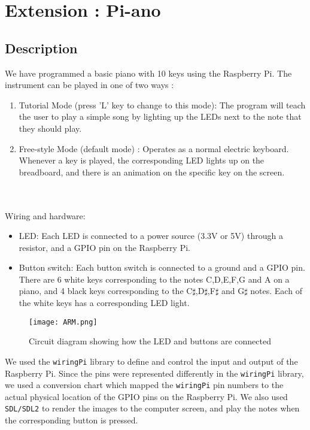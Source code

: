\documentclass[11pt]{article}
\begin{document}
\section{Extension : Pi-ano} 
\subsection{Description}
We have programmed a basic piano with 10 keys using the Raspberry Pi. The instrument can be played in one of two ways :
\renewcommand{\theenumi}{\alph{enumi}}
\begin{enumerate}
\item Tutorial Mode (press 'L' key to change to this mode): The program will teach the user to play a simple song by lighting up the LEDs next to the note that they should play.
\item Free-style Mode (default mode) : Operates as a normal electric keyboard. Whenever a key is played, the corresponding LED lights up on the breadboard, and there is an animation on the specific key on the screen.
\\
\\
\\
\end{enumerate}
Wiring and hardware:

\begin{itemize}
\item LED: Each LED is connected to a power source (3.3V or 5V) through a resistor, and a GPIO pin on the Raspberry Pi.
\item Button switch: Each button switch is connected to a ground and a GPIO pin. There are 6 white keys corresponding to the notes C,D,E,F,G and A on a piano, and 4 black keys corresponding to the C$\sharp$,D$\sharp$,F$\sharp$ and G$\sharp$ notes. Each of the white keys has a corresponding LED light.
\end{itemize}

\begin{figure}[h]
\centering
\texttt{[image: ARM.png]}
\caption{Circuit diagram showing how the LED and buttons are connected}
\end{figure}


We used the \texttt{wiringPi} library to define and control the input and output of the Raspberry Pi. Since the pins were represented differently in the \texttt{wiringPi} library, we used a conversion chart which mapped the \texttt{wiringPi} pin numbers to the actual physical location of the GPIO pins on the Raspberry Pi. We also used \texttt{SDL/SDL2} to render the images to the computer screen, and play the notes when the corresponding button is pressed.
\\
\end{document}
